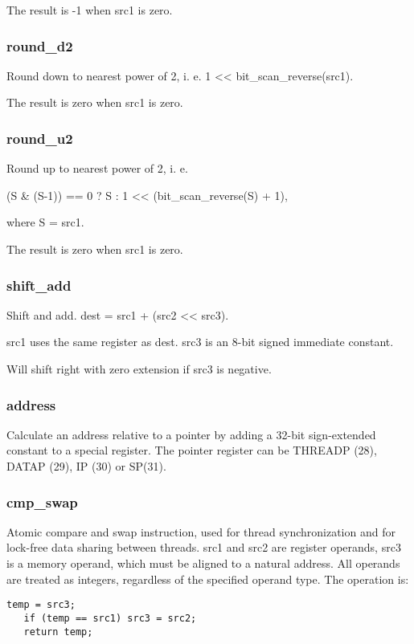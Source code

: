 \documentclass[forwardcom.tex]{subfiles}
\begin{document}
The result is -1 when src1 is zero.

\subsubsection{round\_d2}
Round down to nearest power of 2, i. e. 1 \textless\textless{} bit\_scan\_reverse(src1).

The result is zero when src1 is zero.

\subsubsection{round\_u2}
Round up to nearest power of 2, i. e. 

(S \& (S-1)) == 0 ? S : 1 \textless\textless{}  (bit\_scan\_reverse(S) + 1),

where S = src1.

The result is zero when src1 is zero.

\subsubsection{shift\_add}
Shift and add. dest = src1 + (src2 \textless\textless{}  src3).
\vspace{2mm}

src1 uses the same register as dest. src3 is an 8-bit signed immediate constant.
\vspace{2mm}

Will shift right with zero extension if src3 is negative.

\subsubsection{address}
Calculate an address relative to a pointer by adding a 32-bit sign-extended constant to a  special register. The pointer register can be THREADP (28), DATAP (29), IP (30) or SP(31).

\subsubsection{cmp\_swap}
Atomic compare and swap instruction, used for thread synchronization and for lock-free data sharing between threads. src1 and src2 are register operands, src3 is a memory operand, which must be aligned to a natural address. All operands are treated as integers, regardless of the specified operand type. The operation is:

\begin{lstlisting}[frame=none]
   temp = src3;
   if (temp == src1) src3 = src2;
   return temp;
\end{lstlisting}
\end{document}

